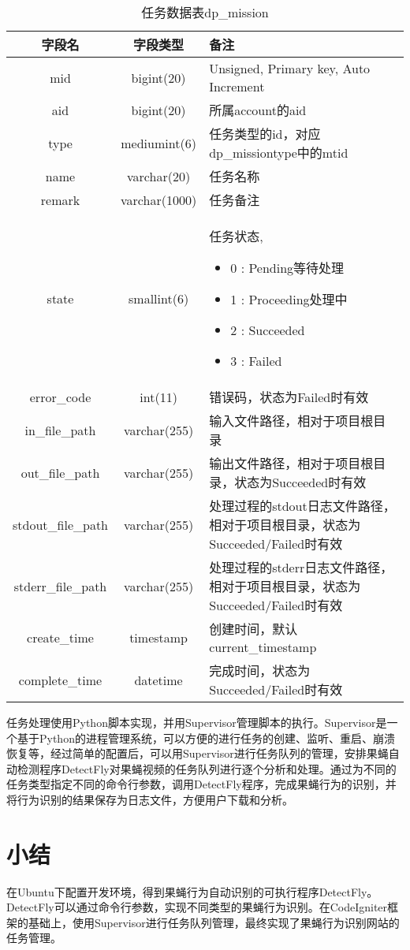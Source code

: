 \begin{table}
\centering
\caption{任务数据表dp\_mission}
\label{tab:misson}
\begin{tabular}{ccp{}}
\toprule[1.5pt]
字段名 & 字段类型 & 备注 \\ \midrule[1pt]
mid & bigint(20) & Unsigned, Primary key, Auto Increment \\
aid & bigint(20) & 所属account的aid \\
type & mediumint(6) & 任务类型的id，对应dp\_missiontype中的mtid \\
name & varchar(20) & 任务名称 \\
remark & varchar(1000) & 任务备注 \\
state & smallint(6) & {任务状态,
\begin{itemize}
    \item 0 : Pending等待处理
    \item 1 : Proceeding处理中
    \item 2 : Succeeded
    \item 3 : Failed
\end{itemize}} \\
error\_code & int(11) & 错误码，状态为Failed时有效 \\
in\_file\_path & varchar(255) & 输入文件路径，相对于项目根目录 \\
out\_file\_path & varchar(255) & 输出文件路径，相对于项目根目录，状态为Succeeded时有效 \\
stdout\_file\_path & varchar(255) & 处理过程的stdout日志文件路径，相对于项目根目录，状态为Succeeded/Failed时有效 \\
stderr\_file\_path & varchar(255) & 处理过程的stderr日志文件路径，相对于项目根目录，状态为Succeeded/Failed时有效 \\
create\_time & timestamp & 创建时间，默认current\_timestamp \\
complete\_time & datetime & 完成时间，状态为Succeeded/Failed时有效 \\
\bottomrule[1.5pt]
\end{tabular}
\end{table}

任务处理使用Python脚本实现，并用Supervisor管理脚本的执行。Supervisor是一个基于Python的进程管理系统，可以方便的进行任务的创建、监听、重启、崩溃恢复等，经过简单的配置后，可以用Supervisor进行任务队列的管理，安排果蝇自动检测程序DetectFly对果蝇视频的任务队列进行逐个分析和处理。通过为不同的任务类型指定不同的命令行参数，调用DetectFly程序，完成果蝇行为的识别，并将行为识别的结果保存为日志文件，方便用户下载和分析。

\section{小结}

在Ubuntu下配置开发环境，得到果蝇行为自动识别的可执行程序DetectFly。DetectFly可以通过命令行参数，实现不同类型的果蝇行为识别。在CodeIgniter框架的基础上，使用Supervisor进行任务队列管理，最终实现了果蝇行为识别网站的任务管理。
